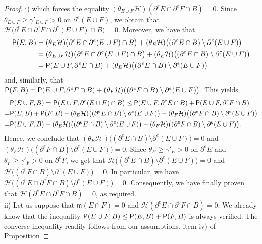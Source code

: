 \documentclass[reqno]{amsart}
\numberwithin{equation}{section}
\newcommand{\mm}{\mathfrak m}
\newcommand{\1}{\mathbbm 1}
\renewcommand{\P}{{\sf P}}
\renewcommand{\H}{{\mathcal H}}
\begin{document}
\begin{proof} {\color{blue}i)}
which forces the equality \((\theta_{E\cup F}\H)(\partial^e E\cap\partial^e F\cap B)=0\).
Since \(\theta_{E\cup F}\geq\gamma'_{E\cup F}>0\) on \(\partial^e(E\cup F)\),
we obtain that \(\H\big(\partial^e E\cap\partial^e F\cap\partial^e(E\cup F)\cap B\big)=0\).
Moreover, we have that
\[\begin{split}
\P(E,B)&=(\theta_E\H)\big(\partial^e E\cap\partial^e(E\cup F)\cap B\big)+
(\theta_E\H)\big((\partial^e E\cap B)\setminus\partial^e(E\cup F)\big)\\
&=(\theta_{E\cup F}\H)\big(\partial^e E\cap\partial^e(E\cup F)\cap B\big)+
(\theta_E\H)\big((\partial^e E\cap B)\setminus\partial^e(E\cup F)\big)\\
&=\P(E\cup F,\partial^e E\cap B)+
(\theta_E\H)\big((\partial^e E\cap B)\setminus\partial^e(E\cup F)\big)
\end{split}\]
and, similarly, that \(\P(F,B)=\P(E\cup F,\partial^e F\cap B)+
(\theta_F\H)\big((\partial^e F\cap B)\setminus\partial^e(E\cup F)\big)\). This yields
\[\begin{split}
&\P(E\cup F,B)=\P\big(E\cup F,\partial^e(E\cup F)\cap B\big)
\leq\P(E\cup F,\partial^e E\cap B)+\P(E\cup F,\partial^e F\cap B)\\
=&\P(E,B)+\P(F,B)-(\theta_E\H)\big((\partial^e E\cap B)\setminus\partial^e(E\cup F)\big)
-(\theta_F\H)\big((\partial^e F\cap B)\setminus\partial^e(E\cup F)\big)\\
=&\P(E\cup F,B)-(\theta_E\H)\big((\partial^e E\cap B)\setminus\partial^e(E\cup F)\big)
-(\theta_F\H)\big((\partial^e F\cap B)\setminus\partial^e(E\cup F)\big).
\end{split}\]
Hence, we conclude that
\((\theta_E\H)\big((\partial^e E\cap B)\setminus\partial^e(E\cup F)\big)=0\) and
\((\theta_F\H)\big((\partial^e F\cap B)\setminus\partial^e(E\cup F)\big)=0\).
Since \(\theta_E\geq\gamma'_E>0\) on \(\partial^e E\) and
\(\theta_F\geq\gamma'_F>0\) on \(\partial^e F\), we get that
\(\H\big((\partial^e E\cap B)\setminus\partial^e(E\cup F)\big)=0\)
and \(\H\big((\partial^e F\cap B)\setminus\partial^e(E\cup F)\big)=0\).
In particular, we have
\(\H\big((\partial^e E\cap\partial^e F\cap B)\setminus\partial^e(E\cup F)\big)=0\).
Consequently, we have finally proven that \(\H(\partial^e E\cap\partial^e F\cap B)=0\),
as required.\\
{\color{blue}ii)} Let us suppose that \(\mm(E\cap F)=0\) and
\(\H(\partial^e E\cap\partial^e F\cap B)=0\). We already know that the inequality
\(\P(E\cup F,B)\leq\P(E,B)+\P(F,B)\) is always verified. The converse inequality
readily follows from our assumptions, item iv) of Proposition

\end{proof}
\end{document}
